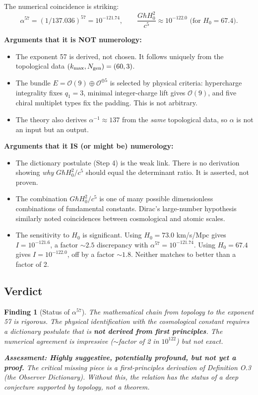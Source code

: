 \documentclass[11pt]{article}
\newtheorem{finding}{Finding}
\begin{document}
The numerical coincidence is striking:
\[
\alpha^{57} = (1/137.036)^{57} = 10^{-121.74}, \qquad \frac{G\hbar H_0^2}{c^5} \approx 10^{-122.0} \text{ (for } H_0 = 67.4\text{)}.
\]

\textbf{Arguments that it is NOT numerology:}
\begin{itemize}
\item The exponent 57 is derived, not chosen. It follows uniquely from the topological data $(k_{\max}, N_{\rm gen}) = (60, 3)$.
\item The bundle $E = \mathcal{O}(9) \oplus \mathcal{O}^{\oplus 5}$ is selected by physical criteria: hypercharge integrality fixes $q_1 = 3$, minimal integer-charge lift gives $\mathcal{O}(9)$, and five chiral multiplet types fix the padding. This is not arbitrary.
\item The theory also derives $\alpha^{-1} \approx 137$ from the \emph{same} topological data, so $\alpha$ is not an input but an output.
\end{itemize}

\textbf{Arguments that it IS (or might be) numerology:}
\begin{itemize}
\item The dictionary postulate (Step 4) is the weak link. There is no derivation showing \emph{why} $G\hbar H_0^2/c^5$ should equal the determinant ratio. It is asserted, not proven.
\item The combination $G\hbar H_0^2/c^5$ is one of many possible dimensionless combinations of fundamental constants. Dirac's large-number hypothesis similarly noted coincidences between cosmological and atomic scales.
\item The sensitivity to $H_0$ is significant. Using $H_0 = 73.0$ km/s/Mpc gives $I = 10^{-121.6}$, a factor $\sim 2.5$ discrepancy with $\alpha^{57} = 10^{-121.74}$. Using $H_0 = 67.4$ gives $I = 10^{-122.0}$, off by a factor $\sim 1.8$. Neither matches to better than a factor of 2.
\end{itemize}

\subsection{Verdict}

\begin{finding}[Status of $\alpha^{57}$]
The mathematical chain from topology to the exponent 57 is rigorous. The physical identification with the cosmological constant requires a dictionary postulate that is \textbf{not derived from first principles}. The numerical agreement is impressive ($\sim$factor of 2 in $10^{122}$) but not exact.

\textbf{Assessment: Highly suggestive, potentially profound, but not yet a proof.} The critical missing piece is a first-principles derivation of Definition O.3 (the Observer Dictionary). Without this, the relation has the status of a deep conjecture supported by topology, not a theorem.
\end{finding}
\end{document}
